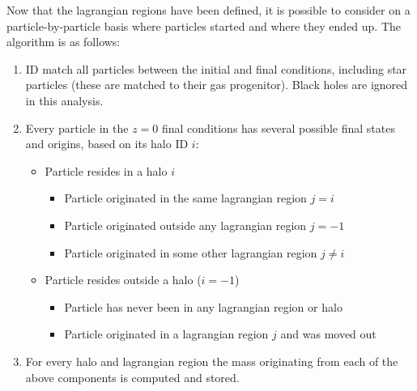 Now that the lagrangian regions have been defined, it is possible to consider on
a particle-by-particle basis where particles started and where they ended up.
The algorithm is as follows:
\begin{enumerate}
	\item ID match all particles between the initial and final conditions, including
	      star particles (these are matched to their gas progenitor). Black holes
	      are ignored in this analysis.

	\item Every particle in the $z=0$ final conditions has several possible final
	      states and origins, based on its halo ID $i$:
	      \begin{itemize}
	            \item Particle resides in a halo $i$
	            \begin{itemize}
	           		\item Particle originated in the same lagrangian region $j = i$
	           		\item Particle originated outside any lagrangian region $j = -1$
	           		\item Particle originated in some other lagrangian region $j \neq i$
	            \end{itemize}
	            \item Particle resides outside a halo ($i = -1$)
	            \begin{itemize}
	            	\item Particle has never been in any lagrangian region or halo
	            	\item Particle originated in a lagrangian region $j$ and was moved out
	            \end{itemize}
	      \end{itemize}
	      
	\item For every halo and lagrangian region the mass originating from each
	      of the above components is computed and stored.
\end{enumerate}

